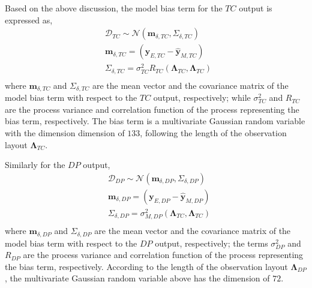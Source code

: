 Based on the above discussion, the model bias term for the $TC$ output is expressed as,
\begin{equation}
	\begin{split}
		& \bm{\mathcal{D}}_{TC} \sim \mathcal{N} (\mathbf{m}_{\delta,TC}, \Sigma_{\delta,TC}) \\
		& \mathbf{m}_{\delta,TC} = \left(\mathbf{y}_{E,TC} - \mathbf{\hat{y}}_{M,TC}\right) \\
		& \Sigma_{\delta,TC} = \sigma_{TC}^2 R_{TC}(\boldsymbol{\Lambda}_{TC}, \boldsymbol{\Lambda}_{TC})\ \\
	\end{split}
\label{eq:feba_gp_bias_tc}
\end{equation}
where $\mathbf{m}_{\delta,TC}$ and $\Sigma_{\delta,TC}$ are the mean vector and the covariance matrix of the model bias term with respect to the $TC$ output, respectively;
while $\sigma_{TC}^2$ and $R_{TC}$ are the process variance and correlation function of the process representing the bias term, respectively.
The bias term is a multivariate Gaussian random variable with the dimension dimension of $133$, following the length of the observation layout $\boldsymbol{\Lambda}_{TC}$.

Similarly for the $DP$ output,
\begin{equation}
	\begin{split}
		& \bm{\mathcal{D}}_{DP} \sim \mathcal{N} (\mathbf{m}_{\delta,DP}, \Sigma_{\delta,DP}) \\
		& \mathbf{m}_{\delta,DP} = \left(\mathbf{y}_{E,DP} - \mathbf{\hat{y}}_{M,DP}\right) \\
		& \Sigma_{\delta,DP} = \sigma_{M,DP}^2(\boldsymbol{\Lambda}_{TC}, \boldsymbol{\Lambda}_{TC}) \\
	\end{split}
\label{eq:feba_gp_bias_dp}
\end{equation}
where $\mathbf{m}_{\delta,DP}$ and $\Sigma_{\delta,DP}$ are the mean vector and the covariance matrix of the model bias term with respect to the $DP$ output, respectively;
the terms $\sigma_{DP}^2$ and $R_{DP}$ are the process variance and correlation function of the process representing the bias term, respectively.
According to the length of the observation layout $\boldsymbol{\Lambda}_{DP}$, the multivariate Gaussian random variable above has the dimension of $72$. 

